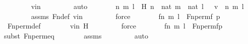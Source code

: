 \begin{isabellebody}
\ \ \ \ \ \ \isamarkupfalse%
\ vin\ \isanewline
\ \ \ \ \ \ \isamarkupfalse%
\ auto\isanewline
\ \ \ \ \isamarkupfalse%
\ \isamarkupfalse%
\ n\ m\ l\ \ H{\isacharcolon}{\kern0pt}\ {\isachardoublequoteopen}n\ {\isasymin}\ nat{\isachardoublequoteclose}\ {\isachardoublequoteopen}m\ {\isasymin}\ nat{\isachardoublequoteclose}\ {\isachardoublequoteopen}l\ {\isasymin}\ {}{\isachardoublequoteclose}\ {\isachardoublequoteopen}v\ {\isacharequal}{\kern0pt}\ {\isacharless}{\kern0pt}{\isacharless}{\kern0pt}n{\isacharcomma}{\kern0pt}\ m{\isachargreater}{\kern0pt}{\isacharcomma}{\kern0pt}\ l{\isachargreater}{\kern0pt}{\isachardoublequoteclose}\ \isanewline
\ \ \ \ \ \ \isamarkupfalse%
\ assms\ Fn{\isacharunderscore}{\kern0pt}def\ vin\ \isanewline
\ \ \ \ \ \ \isamarkupfalse%
\ force\isanewline
\ \ \ \ \isamarkupfalse%
\ \isamarkupfalse%
\ {\isachardoublequoteopen}{\isacharless}{\kern0pt}{\isacharless}{\kern0pt}f{\isacharbackquote}{\kern0pt}n{\isacharcomma}{\kern0pt}\ m{\isachargreater}{\kern0pt}{\isacharcomma}{\kern0pt}\ l{\isachargreater}{\kern0pt}\ {\isasymin}\ Fn{\isacharunderscore}{\kern0pt}perm{\isacharparenleft}{\kern0pt}f{\isacharcomma}{\kern0pt}\ p{\isacharprime}{\kern0pt}{\isacharparenright}{\kern0pt}{\isachardoublequoteclose}\ \isanewline
\ \ \ \ \ \ \isamarkupfalse%
\ Fn{\isacharunderscore}{\kern0pt}perm{\isacharunderscore}{\kern0pt}def\isanewline
\ \ \ \ \ \ \isamarkupfalse%
\ vin\ H\ \isanewline
\ \ \ \ \ \ \isamarkupfalse%
\ force\isanewline
\ \ \ \ \isamarkupfalse%
\ \isamarkupfalse%
\ {\isachardoublequoteopen}{\isacharless}{\kern0pt}{\isacharless}{\kern0pt}f{\isacharbackquote}{\kern0pt}n{\isacharcomma}{\kern0pt}\ m{\isachargreater}{\kern0pt}{\isacharcomma}{\kern0pt}\ l{\isachargreater}{\kern0pt}\ {\isasymin}\ Fn{\isacharunderscore}{\kern0pt}perm{\isacharprime}{\kern0pt}{\isacharparenleft}{\kern0pt}f{\isacharparenright}{\kern0pt}{\isacharbackquote}{\kern0pt}p{\isacharprime}{\kern0pt}{\isachardoublequoteclose}\isanewline
\ \ \ \ \ \ \isamarkupfalse%
{\isacharparenleft}{\kern0pt}subst\ Fn{\isacharunderscore}{\kern0pt}perm{\isacharprime}{\kern0pt}{\isacharunderscore}{\kern0pt}eq{\isacharparenright}{\kern0pt}\isanewline
\ \ \ \ \ \ \isamarkupfalse%
\ assms\ \isanewline
\ \ \ \ \ \ \isamarkupfalse%
\ auto\isanewline
\ \ \ \ \isamarkupfalse%
\ \isamarkupfalse%

\end{isabellebody}
